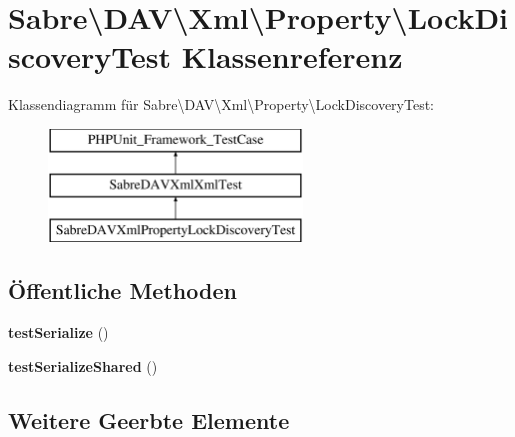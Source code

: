 \hypertarget{class_sabre_1_1_d_a_v_1_1_xml_1_1_property_1_1_lock_discovery_test}{}\section{Sabre\textbackslash{}D\+AV\textbackslash{}Xml\textbackslash{}Property\textbackslash{}Lock\+Discovery\+Test Klassenreferenz}
\label{class_sabre_1_1_d_a_v_1_1_xml_1_1_property_1_1_lock_discovery_test}
Klassendiagramm für Sabre\textbackslash{}D\+AV\textbackslash{}Xml\textbackslash{}Property\textbackslash{}Lock\+Discovery\+Test\+:\begin{figure}[H]
\begin{center}
\leavevmode
\includegraphics[height=3.000000cm]{class_sabre_1_1_d_a_v_1_1_xml_1_1_property_1_1_lock_discovery_test}
\end{center}
\end{figure}
\subsection*{Öffentliche Methoden}
\begin{DoxyCompactItemize}
\item 
\mbox{\label{class_sabre_1_1_d_a_v_1_1_xml_1_1_property_1_1_lock_discovery_test_ad3839af0d56a0571226b5ca439eab5ef}} 
{\bfseries test\+Serialize} ()
\item 
\mbox{\label{class_sabre_1_1_d_a_v_1_1_xml_1_1_property_1_1_lock_discovery_test_a36ba3a66f0957a0dfece05c949487784}} 
{\bfseries test\+Serialize\+Shared} ()
\end{DoxyCompactItemize}
\subsection*{Weitere Geerbte Elemente}


